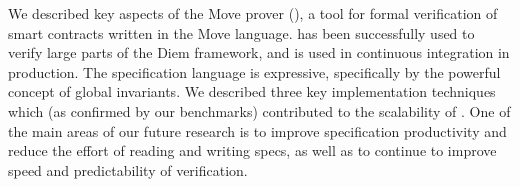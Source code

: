 
We described key aspects of the Move prover (\MVP), a tool for formal
verification of smart contracts written in the Move language. \MVP has been
successfully used to verify large parts of the Diem framework, and is used in
continuous integration in production. The specification language is expressive,
specifically by the powerful concept of global invariants.  We described three
key implementation techniques which (as confirmed by our benchmarks) contributed
to the scalability of \MVP. One of the main areas of our future research is to
improve specification productivity and reduce the effort of reading and writing
specs, as well as to continue to improve speed and predictability of verification.



